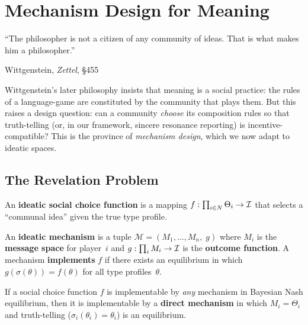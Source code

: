
\chapter{Mechanism Design for Meaning}
\label{ch:mechanism}

\epigraph{``The philosopher is not a citizen of any community of
ideas.  That is what makes him a philosopher.''}{Wittgenstein,
\textit{Zettel}, \S455}

Wittgenstein's later philosophy insists that meaning is a social
practice: the rules of a language-game are constituted by the
community that plays them.  But this raises a design question:
can a community \emph{choose} its composition rules so that
truth-telling (or, in our framework, sincere resonance reporting)
is incentive-compatible?  This is the province of \emph{mechanism
design}, which we now adapt to ideatic spaces.

\section{The Revelation Problem}
\label{sec:revelation}

\begin{definition}
\label{def:scf}
An \textbf{ideatic social choice function} is a mapping
$f : \prod_{i \in N} \Theta_i \to \mathcal{I}$ that selects a
``communal idea'' given the true type profile.
\end{definition}

\begin{definition}[Mechanism]
\label{def:mechanism}
An \textbf{ideatic mechanism} is a tuple
$\mathcal{M} = (M_1,\ldots,M_n,\; g)$
where $M_i$ is the \textbf{message space} for player~$i$ and
$g : \prod_i M_i \to \mathcal{I}$ is the \textbf{outcome function}.
A mechanism \textbf{implements} $f$ if there exists an equilibrium
in which $g(\sigma(\theta)) = f(\theta)$ for all type profiles~$\theta$.
\end{definition}

\begin{theorem}
\label{thm:revelation}
If a social choice function $f$ is implementable by \emph{any}
mechanism in Bayesian Nash equilibrium, then it is implementable
by a \textbf{direct mechanism} in which $M_i = \Theta_i$ and
truth-telling ($\sigma_i(\theta_i) = \theta_i$) is an equilibrium.
\end{theorem}

